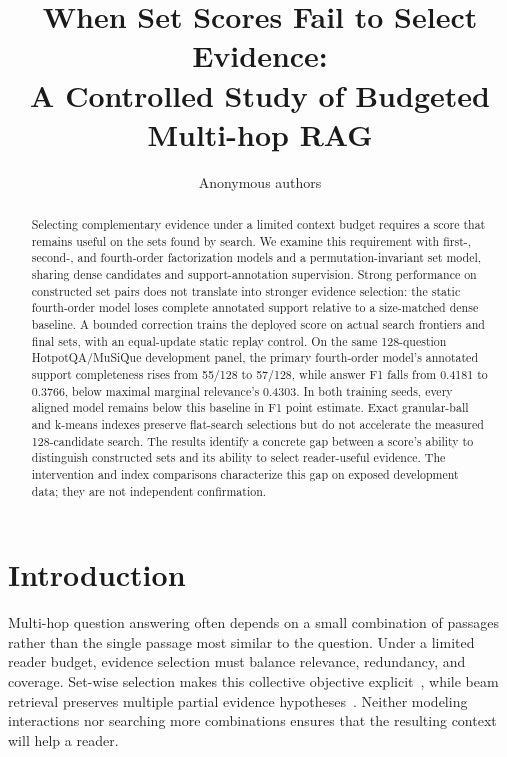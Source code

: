 \documentclass[runningheads]{llncs}
\begin{document}
\title{When Set Scores Fail to Select Evidence:\\A Controlled Study of Budgeted Multi-hop RAG}
\author{Anonymous authors}
\maketitle
\begin{abstract}
Selecting complementary evidence under a limited context budget requires a
score that remains useful on the sets found by search. We examine this
requirement with first-, second-, and fourth-order factorization models and
a permutation-invariant set model, sharing dense candidates and
support-annotation supervision. Strong performance on constructed set pairs
does not translate into stronger evidence selection: the static fourth-order
model loses complete annotated support relative to a size-matched dense
baseline. A bounded correction trains the deployed score on actual search
frontiers and final sets, with an equal-update static replay control.
On the same 128-question HotpotQA/MuSiQue development panel, the primary fourth-order model's
annotated support completeness rises from 55/128 to 57/128, while answer F1
falls from 0.4181 to 0.3766, below maximal marginal relevance's 0.4303.
In both training seeds, every aligned model remains below this baseline
in F1 point estimate.
Exact granular-ball and k-means indexes preserve flat-search
selections but do not accelerate the measured 128-candidate search.
The results identify a concrete gap between a score's ability to distinguish
constructed sets and its ability to select reader-useful evidence. The
intervention and index comparisons characterize this gap on exposed
development data; they are not independent confirmation.
\end{abstract}

\section{Introduction}
Multi-hop question answering often depends on a small combination of
passages rather than the single passage most similar to the question.
Under a limited reader budget, evidence selection must balance relevance,
redundancy, and coverage. Set-wise selection makes this collective objective
explicit~\cite{lee2025setr}, while beam retrieval preserves multiple partial
evidence hypotheses~\cite{zhang2024beam}. Neither modeling interactions nor
searching more combinations ensures that the resulting context will help a
reader.
\end{document}
